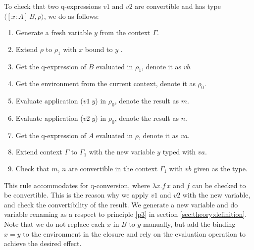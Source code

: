 To check that two q-expressions $v1$ and $v2$ are convertible and has type $\langle [x : A] \, B, \rho \rangle$, we do as follows:
\begin{enumerate}
\item Generate a fresh variable $y$ from the context $\Gamma$.
\item Extend $\rho$ to $\rho_1$ with $x$ bound to $y$ .
\item Get the q-expression of $B$ evaluated in $\rho_1$, denote it as $vb$.
\item Get the environment from the current context, denote it as $\rho_0$.
\item Evaluate application ($v1 \; y$) in $\rho_0$, denote the result as $m$.
\item Evaluate application ($v2 \; y$) in $\rho_0$, denote the result as $n$.
\item Get the q-expression of $A$ evaluated in $\rho$, denote it as $va$.
\item Extend context $\Gamma$ to $\Gamma_1$ with the new variable $y$ typed with $va$.
\item Check that $m$, $n$ are convertible in the context $\Gamma_1$ with $vb$ given as the type.
\end{enumerate}

This rule accommodates for $\eta$-conversion, where $\lambda x . f \, x$ and $f$ can be checked to be convertible. This is the reason why we apply $v1$ and $v2$ with the new variable, and check the convertibility of the result. We generate a new variable and do variable renaming as a respect to principle \ref{p3} in section \ref{sec:theory:definition}. Note that we do not replace each $x$ in $B$ to $y$ manually, but add the binding $x = y$ to the environment in the closure and rely on the evaluation operation to achieve the desired effect.

